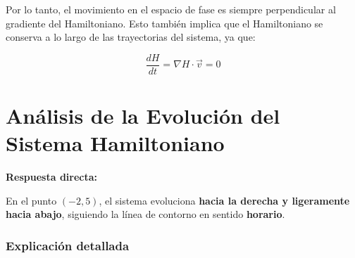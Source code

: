 \documentclass[a4paper]{article}
\begin{document}
Por lo tanto, el movimiento en el espacio de fase es siempre perpendicular al gradiente del Hamiltoniano. Esto también implica que el Hamiltoniano se conserva a lo largo de las trayectorias del sistema, ya que:

$$\frac{dH}{dt} = \nabla H \cdot \vec{v} = 0$$


\section{Análisis de la Evolución del Sistema Hamiltoniano}

\textbf{Respuesta directa:}

En el punto $(-2, 5)$, el sistema evoluciona \textbf{hacia la derecha y ligeramente hacia abajo}, siguiendo la línea de contorno en sentido \textbf{horario}.

\subsubsection*{Explicación detallada}
\end{document}
